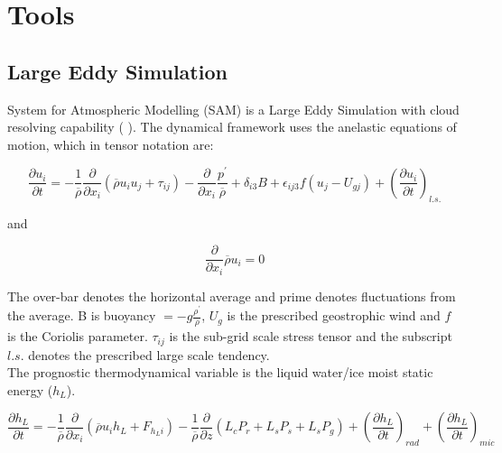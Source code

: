 
\chapter{Tools}
\label{ch:tools}
\setlength{\parindent}{0cm}

\section{Large Eddy Simulation}
\label{sec:LargeEddieSimulation}

System for Atmospheric Modelling (SAM) is a Large Eddy Simulation with cloud resolving capability (\citeauthor{KhairRand} \citeyear{KhairRand}). The dynamical framework uses the anelastic equations of motion, which in tensor notation are:

\begin{equation}
\frac{\partial u_{i}}{\partial t} = -\frac{1}{\overline{\rho}}\frac{\partial}{\partial x_{i}}(\overline{\rho}u_{i}u_{j} + \tau_{ij}) - \frac{\partial}{\partial x_{i}}\frac{p^{'}}{\overline{\rho}} + \delta_{i3}B + \epsilon_{ij3}f(u_{j} - U_{gj}) + \left( \frac{\partial u_{i}}{\partial t} \right)_{l.s.}
\end{equation}

and

\begin{equation}
\frac{\partial}{\partial x_{i}}\overline{\rho}u_{i}=0
\end{equation}


The over-bar denotes the horizontal average and prime denotes fluctuations from the average. B is buoyancy $=-g\frac{\rho^{'}}{\rho}$,  $U_{g}$ is the prescribed geostrophic wind and $f$ is the Coriolis parameter.  $\tau_{ij}$ is the sub-grid scale stress tensor and the subscript $l.s.$ denotes the prescribed large scale tendency.\\      

The prognostic thermodynamical variable is the liquid water/ice moist static energy ($h_{L}$). 

\begin{equation}
\frac{\partial h_{L}}{\partial t} = -\frac{1}{\overline{\rho}}\frac{\partial}{\partial x_{i}}(\overline{\rho} u_{i}h_{L} + F_{h_{L}i}) - \frac{1}{\overline{\rho}}\frac{\partial}{\partial z}(L_{c}P_{r} + L_{s}P_{s} + L_{s}P_{g}) + \left( \frac{\partial h_{L}}{\partial t} \right)_{rad} + \left( \frac{\partial h_{L}}{\partial t} \right)_{mic}
\end{equation}

